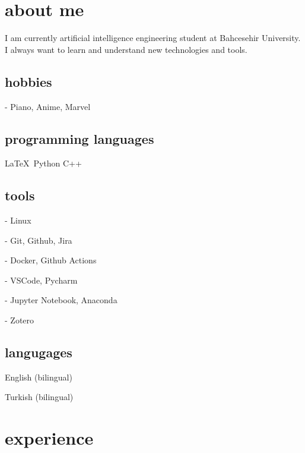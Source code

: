 \documentclass{resume-class} %
\begin{document}
\makeprofile

\section{about me}
I am currently artificial intelligence engineering student at Bahcesehir University. I always want to learn and understand new technologies and tools.

\subsection{hobbies}

- Piano, Anime, Marvel


\subsection{programming languages}

\LaTeX\ Python C++

\subsection{tools}
- Linux

- Git, Github, Jira

- Docker, Github Actions

- VSCode, Pycharm

- Jupyter Notebook, Anaconda

- Zotero

\subsection{langugages}

English (bilingual)

Turkish (bilingual)


\section{experience}
\blindtext
\end{document}
